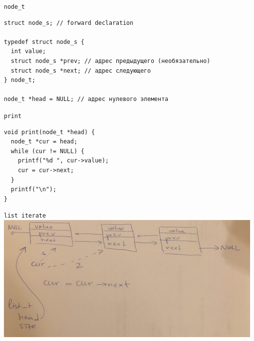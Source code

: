 \documentclass[pdf, 10pt, unicode]{beamer}
\begin{document}
\begin{frame}[fragile]{{\tt node\_t}}
\begin{lstlisting}
struct node_s; // forward declaration

typedef struct node_s {
  int value;
  struct node_s *prev; // адрес предыдущего (необязательно)
  struct node_s *next; // адрес следующего
} node_t;

node_t *head = NULL; // адрес нулевого элемента
\end{lstlisting}
\end{frame}

\begin{frame}[fragile]{{\tt print}}
\begin{lstlisting}
void print(node_t *head) {
  node_t *cur = head;
  while (cur != NULL) {
    printf("%d ", cur->value);
    cur = cur->next;
  }
  printf("\n");
}
\end{lstlisting}
\end{frame}

\begin{frame}[fragile]{{\tt list iterate}}
    \includegraphics[scale=0.1]{list_iterate}
\end{frame}
\end{document}

